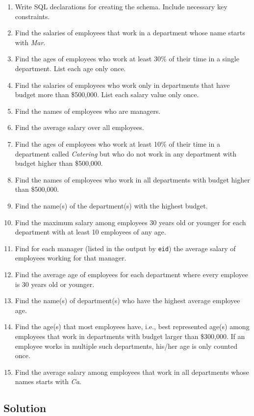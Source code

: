 \begin{enumerate}
\item
Write SQL declarations for creating the schema.
Include necessary key constraints.

\item
Find the salaries of employees that work in a department whose name starts with \textit{Mar}.

\item
Find the ages of employees who work at least 30\% of their time in a single department.
List each age only once.

\item
Find the salaries of employees who work only in departments that have budget more than \$500,000.
List each salary value only once.

\item
Find the names of employees who are managers.

\item
Find the average salary over all employees.

\item
Find the ages of employees who work at least 10\% of their time in a department called \textit{Catering} but who do not work in any department with budget higher than \$500,000.

\item
Find the names of employees who work in all departments with budget higher than \$500,000.

\item
Find the name(s) of the department(s) with the highest budget.

\item
Find the maximum salary among employees 30 years old or younger for each department with at least 10 employees of any age.

\item
Find for each manager (listed in the output by \texttt{eid}) the average salary of employees working for that manager.

\item
Find the average age of employees for each department where every employee is 30 years old or younger.

\item
Find the name(s) of department(s) who have the highest average employee age.

\item
Find the age(s) that most employees have, i.e., best represented age(s) among employees that work in departments with budget larger than \$300,000.
If an employee works in multiple such departments, his/her age is only counted once.

\item Find the average salary among employees that work in all departments whose names starts with \textit{Ca}.

\end{enumerate}

\subsection*{Solution}

\lstset{language=sql}

